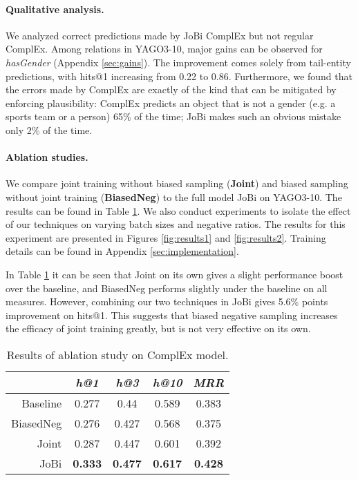 \documentclass[11pt,a4paper, dvipsnames]{article}
\begin{document}
\paragraph{Qualitative analysis.} We analyzed correct predictions made by JoBi ComplEx but not regular ComplEx. Among relations in YAGO3-10, major gains can be observed for \textit{hasGender} (Appendix \ref{sec:gains}). The improvement comes solely from tail-entity predictions, with hits@1 increasing from 0.22 to 0.86. Furthermore, we found that the errors made by ComplEx are exactly of the kind that can be mitigated by enforcing plausibility: ComplEx predicts an object that is not a gender (e.g. a sports team or a person) 65\% of the time; JoBi makes such an obvious mistake only 2\% of the time. 


\paragraph{Ablation studies.} We compare joint training without biased sampling (\textbf{Joint}) and biased sampling without joint training (\textbf{BiasedNeg}) to the full model JoBi on YAGO3-10. The results can be found in Table \ref{tab:results}.  We also conduct experiments to isolate the effect of our techniques on varying batch sizes and negative ratios. The results for this experiment are presented in Figures \ref{fig:results1} and \ref{fig:results2}.  Training details can be found in Appendix \ref{sec:implementation}. 

In Table \ref{tab:results} it can be seen that Joint on its own gives a slight performance boost over the baseline, and BiasedNeg performs slightly under the baseline on all measures. However, combining our two techniques in JoBi gives 5.6\% points improvement on hits@1. This suggests that biased negative sampling increases the efficacy of joint training greatly, but is not very effective on its own.

\begin{table}
    \centering
    \small
    \begin{tabular}{r | c c c c}
         & \textit{h@1} & \textit{h@3} & \textit{h@10} & \textit{MRR} \\
         \hline Baseline & 0.277 & 0.44 & 0.589 & 0.383 \\
         BiasedNeg & 0.276 & 0.427 & 0.568  & 0.375 \\ 
          Joint & 0.287 & 0.447 & 0.601 & 0.392 \\
         JoBi  & \textbf{0.333} & \textbf{0.477} & \textbf{0.617} & \textbf{0.428}  \\
         \hline
         
    \end{tabular}
    \caption{Results of ablation study on ComplEx model.}
\label{tab:results}
\end{table}
\end{document}
